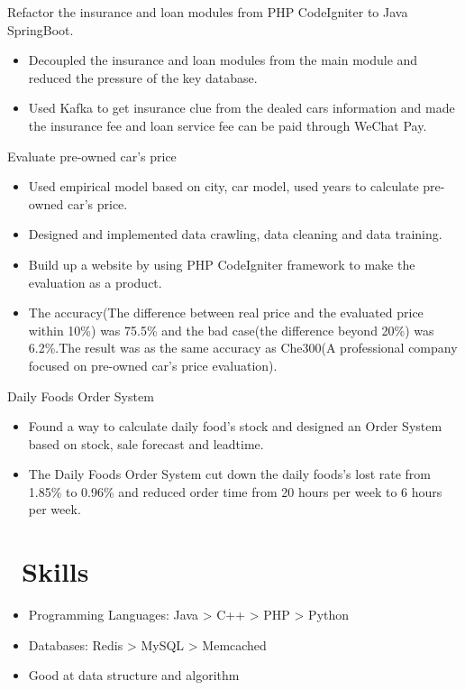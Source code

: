 \documentclass{resume}
\begin{document}
Refactor the insurance and loan modules from PHP CodeIgniter to Java SpringBoot.
\begin{itemize}
  \item Decoupled the insurance and loan modules from the main module and reduced the pressure of the key database.
  \item Used Kafka to get insurance clue from the dealed cars information and made the insurance fee and loan service fee can be paid through WeChat Pay.
\end{itemize}

Evaluate pre-owned car's price
\begin{itemize}
  \item Used empirical model based on city, car model, used years to calculate pre-owned car's price.
  \item Designed and implemented data crawling, data cleaning and data training.
  \item Build up a website by using PHP CodeIgniter framework to make the evaluation as a product.
  \item The accuracy(The difference between real price and the evaluated price within 10\%) was 75.5\% and the bad case(the difference beyond 20\%) was 6.2\%.The result was as the same accuracy as Che300(A professional company focused on pre-owned car's price evaluation).
\end{itemize}

Daily Foods Order System
\begin{itemize}
  \item Found a way to calculate daily food’s stock and designed an Order System based on stock, sale forecast and leadtime.
  \item The Daily Foods Order System cut down the daily foods's lost rate from 1.85\% to 0.96\% and reduced order time from 20 hours per week to 6 hours per week.
\end{itemize}

\section{\faCogs\ Skills}
\begin{itemize}[parsep=0.5ex]
  \item Programming Languages: Java > C++ > PHP > Python
  \item Databases: Redis > MySQL > Memcached
  \item Good at data structure and algorithm
\end{itemize}
\end{document}
